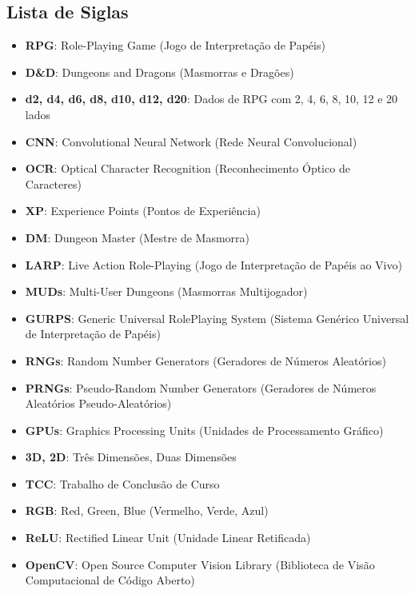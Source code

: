 \documentclass[12pt]{article}
\begin{document}
\begin{center}
\listoffigures
\newpage
\section*{Lista de Siglas}
\begin{itemize}
    \item \textbf{RPG}: Role-Playing Game (Jogo de Interpretação de Papéis)
    \item \textbf{D\&D}: Dungeons and Dragons (Masmorras e Dragões)
    \item \textbf{d2, d4, d6, d8, d10, d12, d20}: Dados de RPG com 2, 4, 6, 8, 10, 12 e 20 lados
    \item \textbf{CNN}: Convolutional Neural Network (Rede Neural Convolucional)
    \item \textbf{OCR}: Optical Character Recognition (Reconhecimento Óptico de Caracteres)
    \item \textbf{XP}: Experience Points (Pontos de Experiência)
    \item \textbf{DM}: Dungeon Master (Mestre de Masmorra)
    \item \textbf{LARP}: Live Action Role-Playing (Jogo de Interpretação de Papéis ao Vivo)
    \item \textbf{MUDs}: Multi-User Dungeons (Masmorras Multijogador)
    \item \textbf{GURPS}: Generic Universal RolePlaying System (Sistema Genérico Universal de Interpretação de Papéis)
    \item \textbf{RNGs}: Random Number Generators (Geradores de Números Aleatórios)
    \item \textbf{PRNGs}: Pseudo-Random Number Generators (Geradores de Números Aleatórios Pseudo-Aleatórios)
    \item \textbf{GPUs}: Graphics Processing Units (Unidades de Processamento Gráfico)
    \item \textbf{3D, 2D}: Três Dimensões, Duas Dimensões
    \item \textbf{TCC}: Trabalho de Conclusão de Curso
    \item \textbf{RGB}: Red, Green, Blue (Vermelho, Verde, Azul)

    \item \textbf{ReLU}: Rectified Linear Unit (Unidade Linear Retificada)
    \item \textbf{OpenCV}: Open Source Computer Vision Library (Biblioteca de Visão Computacional de Código Aberto)
\end{itemize}

\newpage
\tableofcontents
\newpage
\end{center}






\newpage



\end{document}
